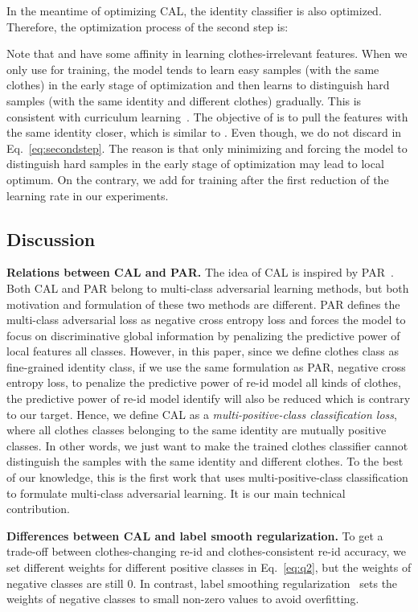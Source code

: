 \documentclass[10pt,twocolumn,letterpaper]{article}
\begin{document}
In the meantime of optimizing CAL, the identity classifier is also optimized.
Therefore, the optimization process of the second step is:

Note that  and  have some affinity in learning clothes-irrelevant features. When we only use  for training, the model tends to learn easy samples (with the same clothes)
in the early stage of optimization and then learns to distinguish hard samples (with the same identity and different clothes) gradually. This is consistent with curriculum learning~\cite{Bengio2009Curriculum}.
The objective of  is to pull the features with the same identity closer, which is similar to . Even though, we do not discard  in Eq.~\eqref{eq:secondstep}.
The reason is that only minimizing  and forcing the model to distinguish hard samples in the early stage of optimization may lead to local optimum.
On the contrary, we add  for training after the first reduction of the learning rate in our experiments.

\subsection{Discussion}
\label{sec:discussion}
\noindent
\textbf{Relations between CAL and PAR.} 
The idea of CAL is inspired by PAR~\cite{Wang2019LearningRobust}. 
Both CAL and PAR belong to multi-class adversarial learning methods, but both motivation and formulation of these two methods are different.
PAR defines the multi-class adversarial loss as negative cross entropy loss and forces the model to focus on discriminative global information by penalizing the predictive power of local features \wrt all classes. 
However, in this paper, since we define clothes class as fine-grained identity class, if we use the same formulation as PAR, \ie negative cross entropy loss, to penalize the predictive power of re-id model \wrt all kinds of clothes, the predictive power of re-id model \wrt identify will also be reduced which is contrary to our target. 
Hence, we define CAL as a \emph{multi-positive-class classification loss}, where all clothes classes belonging to the same identity are mutually positive classes. 
In other words, we just want to make the trained clothes classifier cannot distinguish the samples with the same identity and different clothes.
To the best of our knowledge, this is the first work that uses multi-positive-class classification to formulate multi-class adversarial learning. 
It is our main technical contribution. 

\medskip
\noindent
\textbf{Differences between CAL and label smooth regularization.} 
To get a trade-off between clothes-changing re-id and clothes-consistent re-id accuracy, we set different weights for different positive classes in Eq.~\eqref{eq:q2}, but the weights of negative classes are still 0. In contrast, label smoothing regularization~\cite{Inceptionv2} sets the weights of negative classes to small non-zero values to avoid overfitting.
\end{document}

